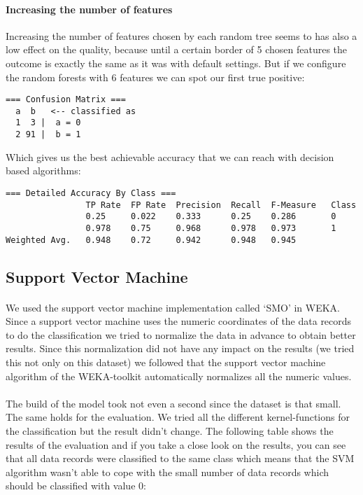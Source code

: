\documentclass[paper=a4, fontsize=11pt]{scrartcl} %
\numberwithin{equation}{section} %
\numberwithin{figure}{section} %
\numberwithin{table}{section} %
\begin{document}
\paragraph{Increasing the number of features}
Increasing the number of features chosen by each random tree seems to has also a low effect on the quality, because until a certain border of 5 chosen features the outcome is exactly the same as it was with default settings. But if we configure the random forests with 6 features we can spot our first true positive:
\begin{lstlisting}
=== Confusion Matrix ===
  a  b   <-- classified as
  1  3 |  a = 0
  2 91 |  b = 1
\end{lstlisting}
Which gives us the best achievable accuracy that we can reach with decision based algorithms:
\begin{lstlisting}
=== Detailed Accuracy By Class ===
                TP Rate  FP Rate  Precision  Recall  F-Measure   Class
                0.25     0.022    0.333      0.25    0.286       0
                0.978    0.75     0.968      0.978   0.973       1
Weighted Avg.   0.948    0.72     0.942      0.948   0.945      
\end{lstlisting}

\subsection{Support Vector Machine}

\paragraph{}We used the support vector machine implementation called `SMO' in WEKA. Since a support vector machine uses the numeric coordinates of the data records to do the classification we tried to normalize the data in advance to obtain better results. Since this normalization did not have any impact on the results (we tried this not only on this dataset) we followed that the support vector machine algorithm of the WEKA-toolkit automatically normalizes all the numeric values.

\paragraph{}The build of the model took not even a second since the dataset is that small. The same holds for the evaluation. We tried all the different kernel-functions for the classification but the result didn't change. The following table shows the results of the evaluation and if you take a close look on the results, you can see that all data records were classified to the same class which means that the SVM algorithm wasn't able to cope with the small number of data records which should be classified with value 0:
\end{document}
